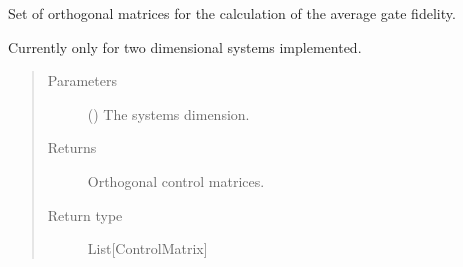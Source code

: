 \documentclass[letterpaper,10pt,english]{sphinxmanual}
\begin{document}
\begin{fulllineitems}
\label{\detokenize{qsim:qsim.cost_functions.default_set_orthorgonal}}
Set of orthogonal matrices for the calculation of the average gate fidelity.

Currently only for two dimensional systems implemented.
\begin{quote}\begin{description}
\item[{Parameters}] \leavevmode
{} () \textendash{} The systems dimension.

\item[{Returns}] \leavevmode
{} \textendash{} Orthogonal control matrices.

\item[{Return type}] \leavevmode
List{[}ControlMatrix{]}

\end{description}\end{quote}

\end{fulllineitems}

\end{document}
